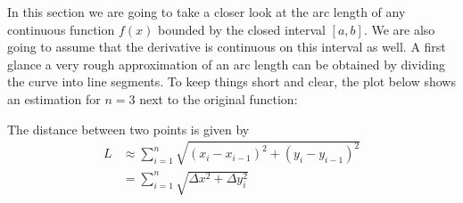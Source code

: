 \begin{flushleft}
	In this section we are going to take a closer look at the arc length of any
	continuous function $f(x)$ bounded by the closed interval $[a,b]$. We are
	also going to assume that the derivative is continuous on this interval as
	well. A first glance a very rough approximation of an arc length can be obtained
	by dividing the curve into line segments. To keep things short and clear, the
	plot below shows an estimation for $n=3$ next to the original function:
\end{flushleft}


\begin{flushleft}
	The distance between two points is given by
	\begin{align}
		L & \approx\sum_{i=1}^n\sqrt{(x_i-x_{i-1})^2+(y_i-y_{i-1})^2}\nonumber       \\
		  & =\sum_{i=1}^n\sqrt{\Delta x^2 + \Delta y_i^2}\label{eq-arc-length-tmp:1}
	\end{align}
\end{flushleft}

